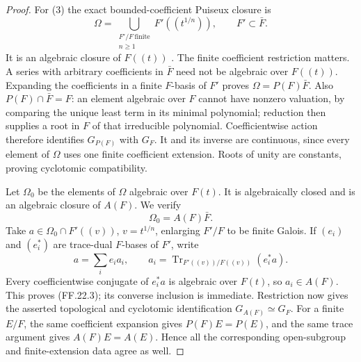 \begin{proof}
For (3) the exact bounded-coefficient Puiseux closure is
\[
 \Omega=\bigcup_{\substack{F'/F\ \mathrm{finite}\\n\ge1}}
                       F'((t^{1/n})),\qquad F'\subset\bar F.
                                                        \tag{FF.22.2}
\]
It is an algebraic closure of \(F((t))\)
\citep[Proposition, p.~314]{FF_vanDenDriesRibenboim1984}.
The finite coefficient restriction matters. A series with
arbitrary coefficients in \(\bar F\) need not be
algebraic over \(F((t))\). Expanding the coefficients
in a finite \(F\)-basis of \(F'\) proves
\(\Omega=P(F)\bar F\). Also \(P(F)\cap\bar F=F\):
an element algebraic over \(F\) cannot have nonzero
valuation, by comparing the unique least term in its
minimal polynomial; reduction then supplies a root in
\(F\) of that irreducible polynomial. Coefficientwise
action therefore identifies \(G_{P(F)}\) with \(G_F\).
It and its inverse are continuous, since every element
of \(\Omega\) uses one finite coefficient extension.
Roots of unity are constants, proving cyclotomic compatibility.

Let \(\Omega_0\) be the elements of \(\Omega\)
algebraic over \(F(t)\). It is algebraically closed and
is an algebraic closure of \(A(F)\). We verify
\[
                         \Omega_0=A(F)\bar F.             \tag{FF.22.3}
\]
Take \(a\in\Omega_0\cap F'((v))\),
\(v=t^{1/n}\), enlarging \(F'/F\) to be finite
Galois. If \((e_i)\) and \((e_i^*)\) are trace-dual
\(F\)-bases of \(F'\), write
\[
 a=\sum_i e_i a_i,\qquad
 a_i=\operatorname{Tr}_{F'((v))/F((v))}(e_i^*a).
\]
Every coefficientwise conjugate of \(e_i^*a\) is
algebraic over \(F(t)\), so \(a_i\in A(F)\).
This proves (FF.22.3); its converse inclusion is immediate.
Restriction now gives the asserted topological and
cyclotomic identification \(G_{A(F)}\simeq G_F\).
For a finite \(E/F\), the same coefficient expansion
gives \(P(F)E=P(E)\), and the same trace argument gives
\(A(F)E=A(E)\). Hence all the corresponding open-subgroup
and finite-extension data agree as well.


\end{proof}
